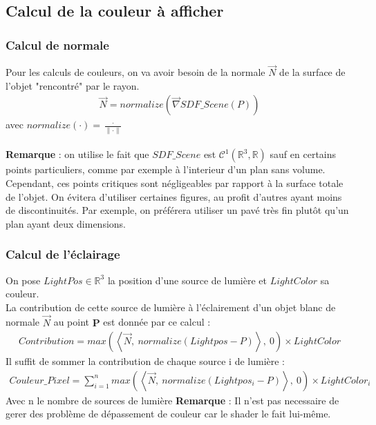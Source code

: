 \newpage
\subsection{Calcul de la couleur à afficher}
\subsubsection{Calcul de normale}
Pour les calculs de couleurs, on va avoir besoin de la normale $\Vec{N}$ de la surface de l'objet "rencontré" par le rayon.
\begin{align*}
    \Vec{N}=normalize(\Vec{\nabla}SDF\_Scene(P))
\end{align*}
avec $normalize(\cdot )=\frac{\cdot }{\|\cdot \|}$\\
\\
\textbf{Remarque} : on utilise le fait que $SDF\_Scene$ est $\mathcal{C}^1(\mathbb{R}^3,\mathbb{R})$ sauf en certains points particuliers, comme par exemple à l'interieur d'un plan sans volume. Cependant, ces points critiques sont négligeables par rapport à la surface totale de l'objet. On évitera d'utiliser certaines figures, au profit d'autres ayant moins de discontinuités. Par exemple, on préférera utiliser un pavé très fin plutôt qu'un plan ayant deux dimensions.
\subsubsection{Calcul de l'éclairage}
On pose $LightPos \in \mathbb{R}^3$ la position d'une source de lumière et $LightColor$ sa couleur.
\\La contribution de cette source de lumière à l'éclairement d'un objet blanc de normale $\Vec{N}$ au point $\mathbf{P}$ est donnée par ce calcul : 
\begin{align*}
    Contribution=max(\left\langle \Vec{N},\ normalize(Lightpos-P) \right\rangle,\ 0) \times LightColor
\end{align*}
Il suffit de sommer la contribution de chaque source i de lumière :
\begin{align*}
    Couleur\_Pixel=\sum_{i=1}^{n} max(\left\langle \Vec{N},\ normalize(Lightpos_i-P) \right\rangle,\ 0) \times LightColor_i
\end{align*}
Avec n le nombre de sources de lumière
\textbf{Remarque} : Il n'est pas necessaire de gerer des problème de dépassement de couleur car le shader le fait lui-même.